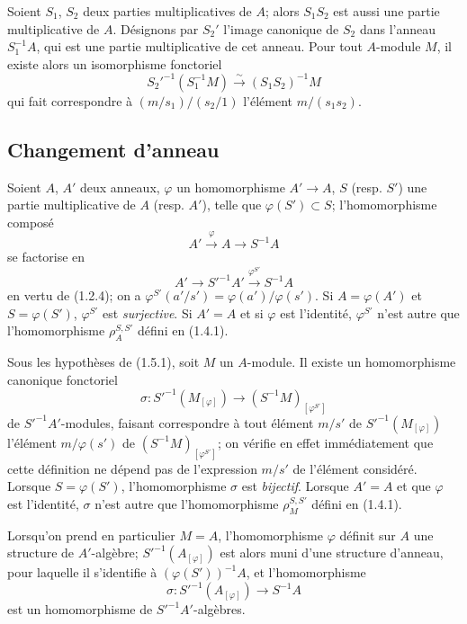 \begin{env}[1.4.6]
\label{0.1.4.6-fr}
Soient $S_1$, $S_2$ deux parties multiplicatives de $A$; alors $S_1S_2$ est aussi une partie multiplicative de $A$.
Désignons par $S_2'$ l'image canonique de $S_2$ dans l'anneau $S_1^{-1}A$, qui est une partie multiplicative de cet anneau.
Pour tout $A$-module $M$, il existe alors un isomorphisme fonctoriel
\[
  S_2'^{-1}(S_1^{-1}M)\xrightarrow{\sim}(S_1S_2)^{-1}M
\]
qui fait correspondre à $(m/s_1)/(s_2/1)$ l'élément $m/(s_1s_2)$.
\end{env}

\subsection{Changement d'anneau}
\label{subsection:0.1.5-fr}

\begin{env}[1.5.1]
\label{0.1.5.1-fr}
Soient $A$, $A'$ deux anneaux, $\varphi$ un homomorphisme $A'\to A$, $S$ (resp. $S'$) une partie multiplicative de $A$ (resp. $A'$), telle que $\varphi(S')\subset S$; l'homomorphisme composé
\[
  A'\xrightarrow{\varphi}A\longrightarrow S^{-1}A
\]
se factorise en
\[
  A'\longrightarrow S'^{-1}A'\xrightarrow{\varphi^{S'}}S^{-1}A
\]
en vertu de (1.2.4); on a $\varphi^{S'}(a'/s')=\varphi(a')/\varphi(s')$.
Si $A=\varphi(A')$ et $S=\varphi(S')$, $\varphi^{S'}$ est \emph{surjective}.
Si $A'=A$ et si $\varphi$ est l'identité, $\varphi^{S'}$ n'est autre que l'homomorphisme $\rho_A^{S,S'}$ défini en (1.4.1).
\end{env}

\begin{env}[1.5.2]
\label{0.1.5.2-fr}
Sous les hypothèses de (1.5.1), soit $M$ un $A$-module.
Il existe un homomorphisme canonique fonctoriel
\[
  \sigma:S'^{-1}(M_{[\varphi]})\longrightarrow
  (S^{-1}M)_{[\varphi^{S'}]}
\]
de $S'^{-1}A'$-modules, faisant correspondre à tout élément $m/s'$ de $S'^{-1}(M_{[\varphi]})$ l'élément $m/\varphi(s')$ de $(S^{-1}M)_{[\varphi^{S'}]}$; on vérifie en effet immédiatement que cette définition ne dépend pas de l'expression $m/s'$ de l'élément considéré.
Lorsque $S=\varphi(S')$, l'homomorphisme $\sigma$ est \emph{bijectif}.
Lorsque $A'=A$ et que $\varphi$ est l'identité, $\sigma$ n'est autre que l'homomorphisme $\rho_M^{S,S'}$ défini en (1.4.1).

Lorsqu'on prend en particulier $M=A$, l'homomorphisme $\varphi$ définit sur $A$ une structure de $A'$-algèbre; $S'^{-1}(A_{[\varphi]})$ est alors muni d'une structure d'anneau, pour laquelle il s'identifie à $(\varphi(S'))^{-1}A$, et l'homomorphisme
\[
  \sigma:S'^{-1}(A_{[\varphi]})\longrightarrow S^{-1}A
\]
est un homomorphisme de $S'^{-1}A'$-algèbres.
\end{env}

